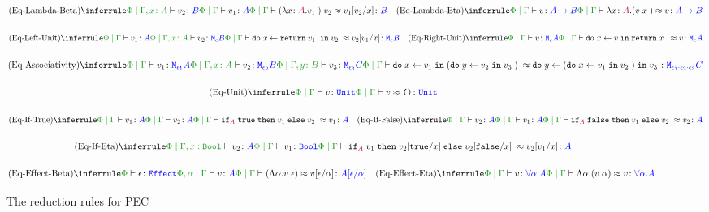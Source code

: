 \documentclass{Report}
\begin{document}
\begin{figure}[H]
    
    \begin{framed}
        \[
            \scalebox{0.8}{$
            \ntreeruleII{\eqbeta}{\etyperelation{\P}{\gax}{v_2}{B}}{\gpetyperelation{v_1}{A}}{\gpeberelation{\apply{(\lam{x}{A}{v_1})}{v_2} }{ v_1\ssub{x}{v_2}}{B}}
            \quad
            \ntreeruleI{\eqeta}{\gpetyperelation{v}{\ab}}{\gpeberelation{\lam{x}{A}{(\apply{v}{x}})}{v}{\ab}}
            $}
        \]
    
        \[\scalebox{0.8}{$
            \ntreeruleII{\eqleftunit}{\gpetyperelation{v_1}{A} }{ \etyperelation{\P}{\gax}{v_2}{\meb}}{\gpeberelation{\doin{x}{\return{v_1}}{v_2}}{v_2\ssub{x}{v_1}}{\meb}}
            \quad
            \ntreeruleI{\eqrightunit}{\gpetyperelation{v}{\mea}}{\gpeberelation{\doin{x}{v}{\return{x}} }{v}{\mea}}
        $}\]
    
        \[\scalebox{0.8}{$
            \ntreeruleIII{\eqassociativity}{\gpetyperelation{v_1}{\M{\e_1}{A}} }{\etyperelation{\P}{\gax}{v_2}{\M{\e_2}{B}}}{ \etyperelation{\P}{\gby}{v_3}{\M{\e_3}{C}}}{
                \gpeberelation{\doin{x}{v_1}{(\doin{y}{v_2}{v_3})}}{\doin{y}{(\doin{x}{v_1}{v_2})}{v_3}}{\M{\e_1 \dot \e_2 \dot \e_3}{C}}
            }
        $}\]
    
        \[\scalebox{0.8}{$
            \ntreeruleI{\equnitequiv}{\gpetyperelation{v}{\U}}{\gpeberelation{v}{\u}{\U}}
        $}\]
    
        \[\scalebox{0.8}{$
            \ntreeruleII{\eqiftrue}{\gpetyperelation{v_1}{A}}{\gpetyperelation{v_2}{A}}{\gpeberelation{\pifthenelse{A}{\t}{v_1}{v_2}}{v_1}{A}}
            \quad
            \ntreeruleII{\eqiffalse}{\gpetyperelation{v_2}{A}}{\gpetyperelation{v_1}{A}}{\gpeberelation{\pifthenelse{A}{\f}{v_1}{v_2}}{v_2}{A}}    
        $}\]
    
        \[\scalebox{0.8}{$
            \ntreeruleII{\eqifeta}{\etyperelation{\P}{\G, x: \B}{v_2}{A}}{\gpetyperelation{v_1}{\B}}{\gpeberelation{\pifthenelse{A}{v_1}{v_2\ssub{x}{\t}}{v_2\ssub{x}{\f}}}{v_2\ssub{x}{v_1}}{A}}
        $}\]
    
        \[\scalebox{0.8}{$
            \ntreeruleII{\eqeffbeta}{\wellformedeffect{\P}{\e}}{\etyperelation{\P, \a}{\G}{v}{A}}{\gpeberelation{\eapp{(\elam{\a}{v}}{\e})}{v\ssub{\a}{\e}}{A\ssub{\a}{\e}}}
            \quad 
            \ntreeruleI{\eqeffeta}{\etyperelation{\P}{\G}{v}{\all{\a}{A}}}{\gpeberelation{\elam{\a}{(\eapp{v}{\a})}}{v}{\all{\a}{A}}}
        $}\]
    \end{framed}
    \caption{The reduction rules for PEC}
    \label{BetaEtaReductions}
\end{figure}
\end{document}

